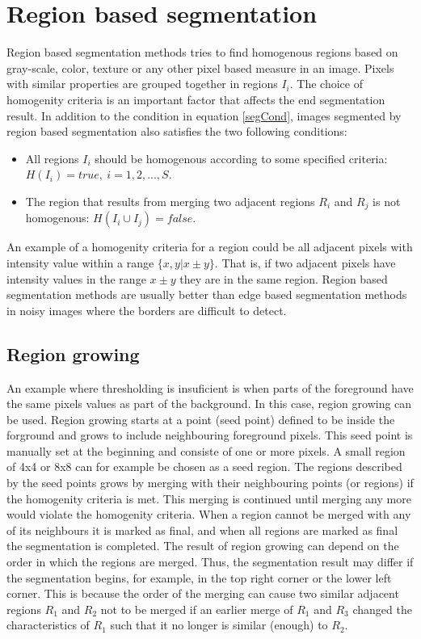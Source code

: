 \section{Region based segmentation}
Region based segmentation methods tries to find homogenous regions based on gray-scale, color, texture or any other pixel based measure in an image. Pixels with similar properties are grouped together in regions \(I_i\). The choice of homogenity criteria is an important factor that affects the end segmentation result. In addition to the condition in equation \ref{segCond}, images segmented by region based segmentation also satisfies the two following conditions:
\begin{itemize}
  \item All regions \(I_i\) should be homogenous according to some specified criteria: \(H(I_i) = true, \ i=1,2,...,S.\) \label{test}
  \item The region that results from merging two adjacent regions \(R_i\) and \(R_j\) is not homogenous: \(H(I_i \cup I_j) = false. \label{test2} \) 
\end{itemize}
An example of a homogenity criteria for a region could be all adjacent pixels with intensity value within a range \(\{x,y|x \pm y\}\). That is, if two adjacent pixels have intensity values in the range \(x \pm y\) they are in the same region. Region based segmentation methods are usually better than edge based segmentation methods in noisy images where the borders are difficult to detect. 

\subsection{Region growing}
An example where thresholding is insuficient is when parts of the foreground
have the same pixels values as part of the background. In this case, region
growing can be used. Region growing starts at a point (seed point) defined
to be inside the forground and grows to include neighbouring foreground
pixels. This seed point is manually set at the beginning and consiste of one
or more pixels. A small region of 4x4 or 8x8 can for example be chosen as a seed region. The regions described by the seed points grows by merging with their neighbouring points (or regions) if the homogenity criteria is met. This merging is continued until merging any more would violate the homogenity criteria. When a region cannot be merged with any of its neighbours it is marked as final, and when all regions are marked as final the segmentation is completed. The result of region growing can depend on the order in which the regions are merged. Thus, the segmentation result may differ if the segmentation begins, for example, in the top right corner or the lower left corner. This is because the order of the merging can cause two similar adjacent regions \(R_1\) and \(R_2\) not to be merged if an earlier merge of \(R_1\) and \(R_3\) changed the characteristics of \(R_1\) such that it no longer is similar (enough) to \(R_2\). 

